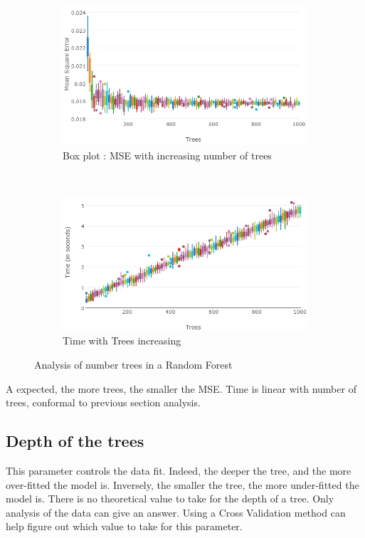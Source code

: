 \documentclass[english,11pt,openany]{report}
\theoremstyle{definition}
\theoremstyle{plain}
\theoremstyle{definition}
\begin{document}
\begin{appendices}
\begin{figure}[H]
	\begin{subfigure}[t]{0.3\textwidth}
		\includegraphics[width=\textwidth]{RF_analysis/mse_trees.png}
		\caption{Box plot : MSE with increasing number of trees}
		\label{} %
	\end{subfigure}
	~~~~~~~~~~~~~~~
	\begin{subfigure}[t]{0.3\textwidth}
		\includegraphics[width=\textwidth]{RF_analysis/timing_trees.png}
		\caption{Time with Trees increasing}
		\label{}
	\end{subfigure}
	\label{}
	\caption{Analysis of number trees in a Random Forest}
\end{figure}

A expected, the more trees, the smaller the MSE. Time is linear with number of trees, conformal to previous section analysis.


\subsection{Depth of the trees}

This parameter controls the data fit. Indeed, the deeper the tree, and the more over-fitted the model is. Inversely, the smaller the tree, the more under-fitted the model is. 
There is no theoretical value to take for the depth of a tree. Only analysis of the data can give an answer. Using a Cross Validation method can help figure out which value to take for this parameter. 


\end{appendices}
\end{document}
